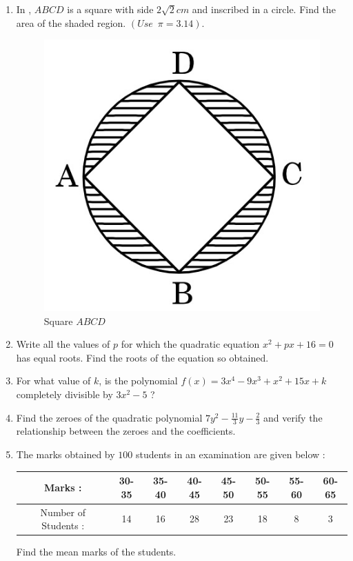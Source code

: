 \documentclass[12pt,-letter paper]{article}
\providecommand{\brak}[1]{\ensuremath{\left(#1\right)}}
\begin{document}
\begin{enumerate}
\item In  , $ABCD$ is a square with side $2\sqrt{2}cm$ and inscribed in a circle. Find the area of the shaded region. $(Use \hspace{6pt}\pi = 3.14)$.
\begin{figure}[H]
    \centering
    \includegraphics[width=\columnwidth]{img5.jpg}
    \caption{Square $ABCD$ }
    \label{fig:Fig_5}
\end{figure}

\item Write all the values of $p$ for which the quadratic equation $x^2 + px + 16 = 0$ has equal roots. Find the roots of the equation so obtained.
\item For what value of $k$, is the polynomial $f\brak{x} = 3x^4-9x^3+x^2+15x+k$ completely divisible by $3x^2 - 5$ ?

\item Find the zeroes of the quadratic polynomial $7y^2 -\frac{11}{3}y -\frac{2}{3}$ and verify the relationship between the zeroes and the coefficients.

\item The marks obtained by $100$ students in an examination are given below :
\begin{center}
 \begin{tabular}{|c | c | c | c| c | c | c | c| } 
 \hline
 Marks :  & 30-35 & 35-40 & 40-45 & 45-50& 50-55& 55-60&60-65  \\ 
\hline
 Number of Students :  & 14 & 16 & 28 & 23 & 18 & 8 &3 \\ 
 \hline
\end{tabular}
\end{center}
Find the mean marks of the students.


\end{enumerate}
\end{document}
